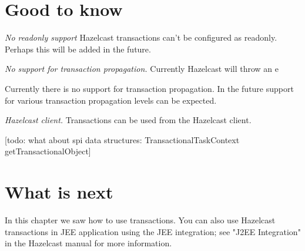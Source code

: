 \section{Good to know}

\emph{No readonly support} Hazelcast transactions can't be configured as readonly. Perhaps this will be added in the future.

\emph{No support for transaction propagation.} Currently Hazelcast will throw an e

Currently there is no support for transaction propagation. In the future support for various transaction propagation levels can be expected. 

\emph{Hazelcast client.} Transactions can be used from the Hazelcast client.

[todo: what about spi data structures: TransactionalTaskContext getTransactionalObject]

\section{What is next}
In this chapter we saw how to use transactions. You can also use Hazelcast transactions in JEE application using the JEE integration; see "J2EE Integration" in the Hazelcast manual for more information.